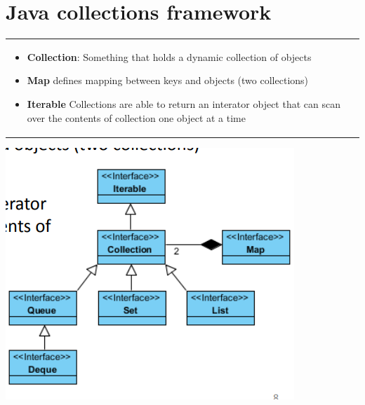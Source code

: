 \documentclass{article}
\begin{document}
\section{Java collections framework}
\begin{tabular}{p{}p{}}
\begin{itemize}
	\item \textbf{Collection}: Something that holds a dynamic collection of objects
	\item \textbf{Map} defines mapping between keys and objects (two collections)
	\item \textbf{Iterable} Collections are able to return an interator object that can scan over the contents of collection one object at a time
\end{itemize}
\end{tabular}
\includegraphics[scale=0.5]{Selection_013.png}
\end{document}
